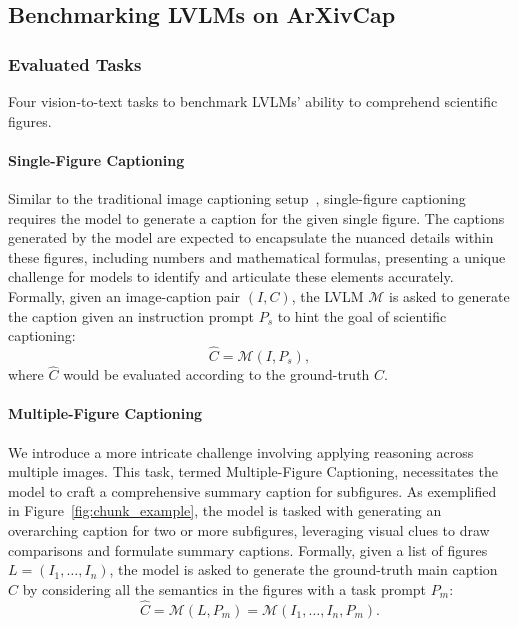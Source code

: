\subsection{Benchmarking LVLMs on ArXivCap}
\label{subsec:exp_arxivcap}
\subsubsection{Evaluated Tasks}
\label{subsubsec:evaluated_task}
Four vision-to-text tasks to benchmark LVLMs' ability to comprehend scientific figures.
\paragraph{Single-Figure Captioning} 
Similar to the traditional image captioning setup~\citep{lin2014mscoco}, single-figure captioning requires the model to generate a caption for the given single figure. 
The captions generated by the model are expected to encapsulate the nuanced details within these figures, including numbers and mathematical formulas, presenting a unique challenge for models to identify and articulate these elements accurately.
Formally, given an image-caption pair $(I, C)$, the LVLM $\mathcal{M}$ is asked to generate the caption given an instruction prompt $P_s$ to hint the goal of scientific captioning:
\begin{equation*}
    \hat{C} = \mathcal{M} (I, P_s),
\end{equation*}
where $\hat{C}$ would be evaluated according to the ground-truth $C$.

\paragraph{Multiple-Figure Captioning}
We introduce a more intricate challenge involving applying reasoning across multiple images. This task, termed Multiple-Figure Captioning, necessitates the model to craft a comprehensive summary caption for subfigures. 
As exemplified in Figure~\ref{fig:chunk_example}, the model is tasked with generating an overarching caption for two or more subfigures, leveraging visual clues to draw comparisons and formulate summary captions.
Formally, given a list of figures $L = \left( I_1, \ldots, I_n\right)$, the model is asked to generate the ground-truth main caption $C$ by considering all the semantics in the figures with a task prompt $P_m$:
\begin{equation*}
    \hat{C} = \mathcal{M} ( L, P_m ) = \mathcal{M} ( I_1, \ldots, I_n, P_m).
\end{equation*}



